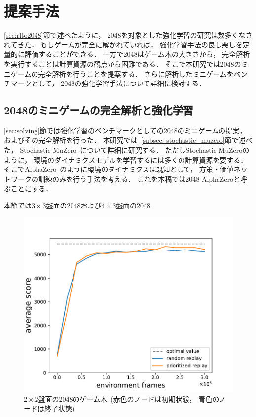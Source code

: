\chapter{提案手法}
\label{chap:proposal}
\ref{sec:rlto2048}節で述べたように， 2048を対象とした強化学習の研究は数多くなされてきた．
もしゲームが完全に解かれていれば， 強化学習手法の良し悪しを定量的に評価することができる．
一方で2048はゲーム木の大きさから， 完全解析を実行することは計算資源の観点から困難である．
そこで本研究では2048のミニゲームの完全解析を行うことを提案する．
さらに解析したミニゲームをベンチマークとして， 2048の強化学習手法について詳細に検討する．



\section{2048のミニゲームの完全解析と強化学習}
\ref{sec:solving}節では強化学習のベンチマークとしての2048のミニゲームの提案， およびその完全解析を行った．
本研究では~\ref{subsec: stochastic_muzero}節で述べた， Stochastic MuZero~\cite{StochasticMuZero}について詳細に研究する．
ただしStochastic MuZeroのように， 環境のダイナミクスモデルを学習するには多くの計算資源を要する．
そこでAlphaZero~\cite{AlphaZero}のように環境のダイナミクスは既知として， 方策・価値ネットワークの訓練のみを行う手法を考える．
これを本稿では2048-AlphaZeroと呼ぶことにする．

本節では$3\times3$盤面の2048および$4\times3$盤面の2048

\begin{figure}[t]
    \centering
    \includegraphics[width=0.7\linewidth{}]{figures/alphazero_3x3.pdf}
    \caption{$2\times2$盤面の2048のゲーム木~(赤色のノードは初期状態， 青色のノードは終了状態)}
    \label{fig:alphazero_3x3}
\end{figure}
